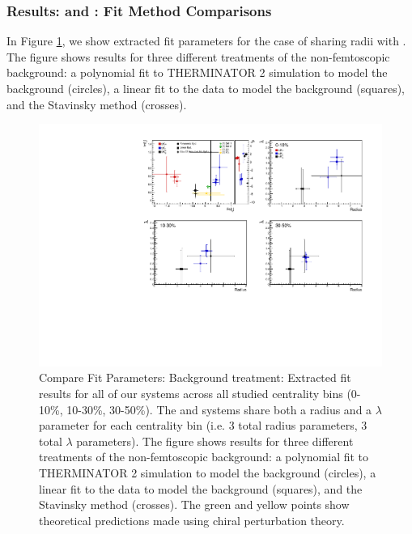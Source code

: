 \documentclass[../AnalysisNoteJBuxton.tex]{subfiles}
\begin{document}
\subsubsection{Results: \LamKs and \LamKpm: Fit Method Comparisons}
\label{ResultsLamK_FitMethComp}

In Figure \ref{fig:FitResults_ShareR_Sharelam_PolyBgd}, we show extracted fit parameters for the case of \LamKchPALamKchM sharing radii with \LamKchMALamKchP.  The figure shows results for three different treatments of the non-femtoscopic background: a polynomial fit to THERMINATOR 2 simulation to model the background (circles), a linear fit to the data to model the background (squares), and the Stavinsky method (crosses).


\begin{figure}[h]
  \centering
  \includegraphics[width=\textwidth]{7_ResultsAndDiscussion/Figures/CompareAllScattParams_CompBgdTreatment_StatOnly.pdf}
  \caption[Compare Fit Parameters: Background treatment]{Compare Fit Parameters: Background treatment: Extracted fit results for all of our \LamALamKpm systems across all studied centrality bins (0-10\%, 10-30\%, 30-50\%).  The \LamKchPALamKchM and \LamKchMALamKchP systems share both a radius and a $\lambda$ parameter for each centrality bin (i.e. 3 total radius parameters, 3 total $\lambda$ parameters).  The figure shows results for three different treatments of the non-femtoscopic background: a polynomial fit to THERMINATOR 2 simulation to model the background (circles), a linear fit to the data to model the background (squares), and the Stavinsky method (crosses).  The green \cite{Liu:2006xja} and yellow \cite{Mai:2009ce} points show theoretical predictions made using chiral perturbation theory.}
  \label{fig:FitResults_ShareR_Sharelam_PolyBgd}
\end{figure}
\end{document}
